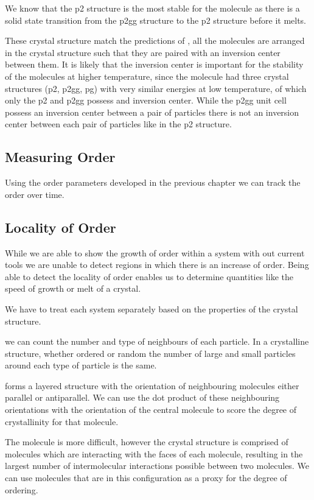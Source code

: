 We know that the p2 structure is the most stable for the \tri molecule as there is a solid state transition from the p2gg structure to the p2 structure before it melts.

These crystal structure match the predictions of \textref{}, all the molecules are arranged in the crystal structure such that they are paired with an inversion center between them. It is likely that the inversion center is important for the stability of the molecules at higher temperature, since the \tri molecule had three crystal structures (p2, p2gg, pg) with very similar energies at low temperature, of which only the p2 and p2gg possess and inversion center. While the p2gg unit cell possess an inversion center between a pair of particles there is not an inversion center between each pair of particles like in the p2 structure.

\subsection{Measuring Order}

Using the order parameters developed in the previous chapter we can track the order over time.

\subsection{Locality of Order}

While we are able to show the growth of order within a system with out current tools we are unable to detect regions in which there is an increase of order. Being able to detect the locality of order enables us to determine quantities like the speed of growth or melt of a crystal.

We have to treat each system separately based on the properties of the crystal structure.

\scon we can count the number and type of neighbours of each particle. In a crystalline structure, whether ordered or random the number of large and small particles around each type of particle is the same.

\sone forms a layered structure with the orientation of neighbouring molecules either parallel or antiparallel. We can use the dot product of these neighbouring orientations with the orientation of the central molecule to score the degree of crystallinity for that molecule.

The \tri molecule is more difficult, however the crystal structure is comprised of molecules which are interacting with the faces of each molecule, resulting in the largest number of intermolecular interactions possible between two molecules. We can use molecules that are in this configuration as a proxy for the degree of ordering.

